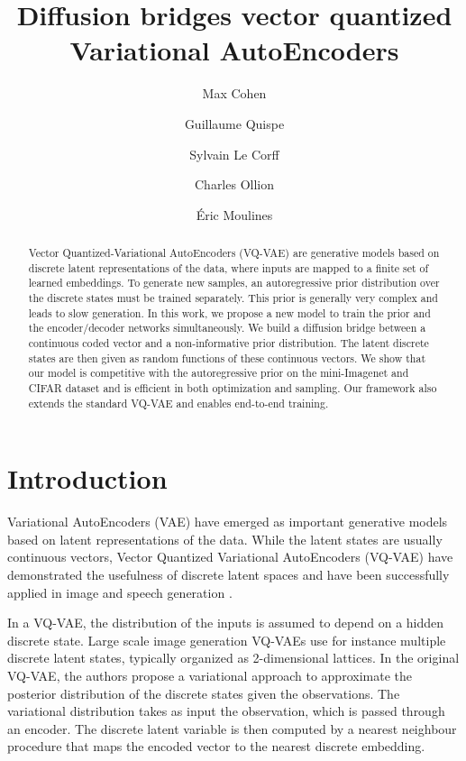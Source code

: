 \documentclass{article}
\title{Diffusion bridges  vector quantized Variational AutoEncoders}
\date{}
\author[$\star$, $\ddag$]{Max Cohen}
\author[$\dag$]{Guillaume Quispe}
\author[$\star$]{Sylvain Le Corff}
\author[$\dag$]{Charles Ollion}
\author[$\dag$]{\'Eric Moulines}
\affil[$\star$]{{\small SAMOVAR, T\'el\'ecom SudParis, Institut Polytechnique de Paris, Palaiseau.}}
\affil[$\ddag$]{{\small Accenta, Boulogne-Billancourt.}}
\affil[$\dag$]{{\small CMAP, \'Ecole Polytechnique, Institut Polytechnique de Paris, Palaiseau.}}
\theoremstyle{plain}
\theoremstyle{definition}
\theoremstyle{remark}
\begin{document}
\maketitle

\begin{abstract}
Vector Quantized-Variational AutoEncoders (VQ-VAE) are generative models based on discrete latent representations of the data, where inputs are mapped to a finite set of learned embeddings.
To generate new samples, an autoregressive prior distribution over the discrete states must be trained separately. This prior is generally very complex and leads to slow generation. In this work, we propose a new model to train the prior and the encoder/decoder networks simultaneously. We build a diffusion bridge between a continuous coded vector and a non-informative prior distribution.  The latent discrete states are then given as random functions of these continuous vectors. We show that our model is competitive with the autoregressive prior on the mini-Imagenet and CIFAR dataset and is efficient in both optimization and sampling. Our framework also extends the standard VQ-VAE and enables end-to-end training.
\end{abstract}


\section{Introduction}
Variational AutoEncoders (VAE) have emerged as important generative models based on latent representations of the data.
While the latent states are usually continuous vectors, Vector Quantized Variational AutoEncoders (VQ-VAE) have demonstrated the usefulness of discrete latent spaces and have been successfully applied in image and speech generation \cite{oord2017neural, esser2021taming, ramesh2021zero}. 

In a VQ-VAE, the distribution of the inputs is assumed to depend on a hidden discrete state. Large scale image generation VQ-VAEs use for instance multiple discrete latent states, typically organized as 2-dimensional lattices. In the original VQ-VAE, the authors propose a variational approach to approximate the posterior distribution of the discrete states given the observations. The variational distribution takes as input the observation, which is passed through an encoder. The discrete latent variable is then computed by a nearest neighbour procedure that maps the encoded vector to the nearest discrete embedding.
\end{document}
